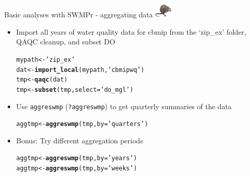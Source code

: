 \documentclass[xcolor=dvipsnames,serif]{beamer}\usepackage[]{graphicx}\usepackage[]{color}
\makeatletter
\newcommand{\hlstr}[1]{\textcolor[rgb]{0.192,0.494,0.8}{#1}}%
\newcommand{\hlstd}[1]{\textcolor[rgb]{0.345,0.345,0.345}{#1}}%
\newcommand{\hlkwb}[1]{\textcolor[rgb]{0.69,0.353,0.396}{#1}}%
\newcommand{\hlkwc}[1]{\textcolor[rgb]{0.333,0.667,0.333}{#1}}%
\newcommand{\hlkwd}[1]{\textcolor[rgb]{0.737,0.353,0.396}{\textbf{#1}}}%
\newenvironment{kframe}{%
 \def\at@end@of@kframe{}%
 \ifinner\ifhmode%
  \def\at@end@of@kframe{\end{minipage}}%
  \begin{minipage}{\columnwidth}%
 \fi\fi%
 \def\FrameCommand##1{\hskip\@totalleftmargin \hskip-\fboxsep
 \colorbox{shadecolor}{##1}\hskip-\fboxsep
     \hskip-\linewidth \hskip-\@totalleftmargin \hskip\columnwidth}%
 \MakeFramed {\advance\hsize-\width
   \@totalleftmargin\z@ \linewidth\hsize
   \@setminipage}}%
 {\par\unskip\endMakeFramed%
 \at@end@of@kframe}
\newenvironment{knitrout}{}{} %
\makeatother
\begin{document}
\begin{frame}[fragile,t]{Basic analyses with SWMPr - aggregating data \includegraphics[width = 0.065\textwidth]{imgs/swmprat.png}}
\begin{itemize}
\item {}
Import all years of water quality data for cbmip from the `zip\_ex' folder, QAQC cleanup, and subset DO
\begin{knitrout}\scriptsize
{}\color{fgcolor}\begin{kframe}
\begin{alltt}
\hlstd{mypath} \hlkwb{<-} \hlstr{'zip_ex'}
\hlstd{dat} \hlkwb{<-} \hlkwd{import_local}\hlstd{(mypath,} \hlstr{'cbmipwq'}\hlstd{)}
\hlstd{tmp} \hlkwb{<-} \hlkwd{qaqc}\hlstd{(dat)}
\hlstd{tmp} \hlkwb{<-} \hlkwd{subset}\hlstd{(tmp,} \hlkwc{select} \hlstd{=} \hlstr{'do_mgl'}\hlstd{)}
\end{alltt}
\end{kframe}
\end{knitrout}
\vspace{0.1in}
\item {}
Use \texttt{aggreswmp} (\texttt{?aggreswmp}) to get quarterly summaries of the data
\begin{knitrout}\scriptsize
{}\color{fgcolor}\begin{kframe}
\begin{alltt}
\hlstd{aggtmp} \hlkwb{<-} \hlkwd{aggreswmp}\hlstd{(tmp,} \hlkwc{by} \hlstd{=} \hlstr{'quarters'}\hlstd{)}
\end{alltt}
\end{kframe}
\end{knitrout}
\vspace{0.1in}
\item {}
Bonus: Try different aggregation periods
\begin{knitrout}\scriptsize
{}\color{fgcolor}\begin{kframe}
\begin{alltt}
\hlstd{aggtmp} \hlkwb{<-} \hlkwd{aggreswmp}\hlstd{(tmp,} \hlkwc{by} \hlstd{=} \hlstr{'years'}\hlstd{)}
\hlstd{aggtmp} \hlkwb{<-} \hlkwd{aggreswmp}\hlstd{(tmp,} \hlkwc{by} \hlstd{=} \hlstr{'weeks'}\hlstd{)}
\end{alltt}

\end{kframe}
\end{knitrout}
\end{itemize}
\end{frame}
\end{document}
